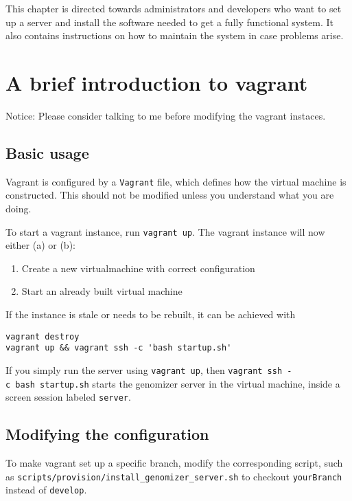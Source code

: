 This chapter is directed towards administrators and developers who want to
set up a server and install the software needed to get a fully functional system.
It also contains instructions on how to maintain the system in case problems arise.

\section{A brief introduction to
vagrant}\label{a-brief-introduction-to-vagrant}

Notice: Please consider talking to me before modifying the vagrant
instaces.

\subsection{Basic usage}\label{basic-usage}

Vagrant is configured by a \texttt{Vagrant} file, which defines how the
virtual machine is constructed. This should not be modified unless you
understand what you are doing.

To start a vagrant instance, run \texttt{vagrant\ up}. The vagrant
instance will now either (a) or (b):

\begin{enumerate}
\def\labelenumi{\alph{enumi})}
\itemsep1pt\parskip0pt
\item
  Create a new virtualmachine with correct configuration
\item
  Start an already built virtual machine
\end{enumerate}

If the instance is stale or needs to be rebuilt, it can be achieved with

\begin{verbatim}
vagrant destroy
vagrant up && vagrant ssh -c 'bash startup.sh'
\end{verbatim}

If you simply run the server using \texttt{vagrant\ up}, then
\texttt{vagrant\ ssh\ -c\ \textquotesingle{}bash\ startup.sh\textquotesingle{}}
starts the genomizer server in the virtual machine, inside a screen
session labeled \texttt{server}.

\subsection{Modifying the
configuration}\label{modifying-the-configuration}

To make vagrant set up a specific branch, modify the corresponding
script, such as \texttt{scripts/provision/install\_genomizer\_server.sh}
to checkout \texttt{yourBranch} instead of \texttt{develop}.

